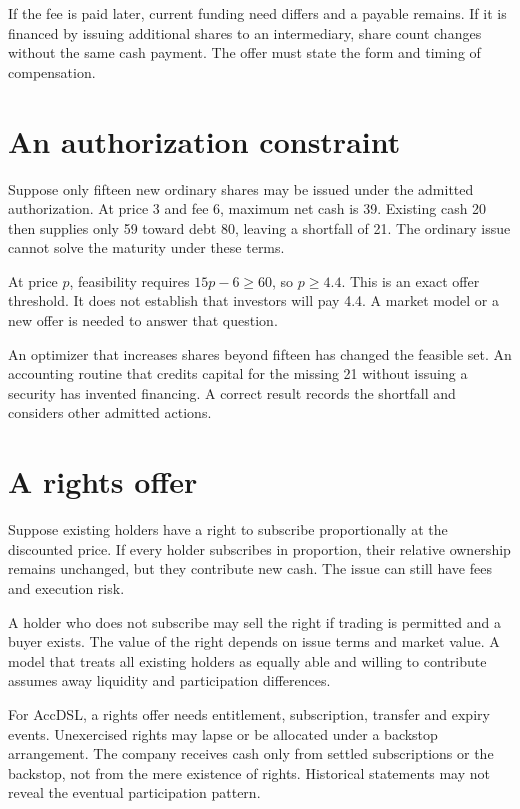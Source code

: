 If the fee is paid later, current funding need differs and a payable remains. If it is financed by issuing additional shares to an intermediary, share count changes without the same cash payment. The offer must state the form and timing of compensation.

\section{An authorization constraint}
Suppose only fifteen new ordinary shares may be issued under the admitted authorization. At price 3 and fee 6, maximum net cash is 39. Existing cash 20 then supplies only 59 toward debt 80, leaving a shortfall of 21. The ordinary issue cannot solve the maturity under these terms.

At price $p$, feasibility requires $15p-6\geq60$, so $p\geq4.4$. This is an exact offer threshold. It does not establish that investors will pay 4.4. A market model or a new offer is needed to answer that question.

An optimizer that increases shares beyond fifteen has changed the feasible set. An accounting routine that credits capital for the missing 21 without issuing a security has invented financing. A correct result records the shortfall and considers other admitted actions.

\section{A rights offer}
Suppose existing holders have a right to subscribe proportionally at the discounted price. If every holder subscribes in proportion, their relative ownership remains unchanged, but they contribute new cash. The issue can still have fees and execution risk.

A holder who does not subscribe may sell the right if trading is permitted and a buyer exists. The value of the right depends on issue terms and market value. A model that treats all existing holders as equally able and willing to contribute assumes away liquidity and participation differences.

For AccDSL, a rights offer needs entitlement, subscription, transfer and expiry events. Unexercised rights may lapse or be allocated under a backstop arrangement. The company receives cash only from settled subscriptions or the backstop, not from the mere existence of rights. Historical statements may not reveal the eventual participation pattern.

